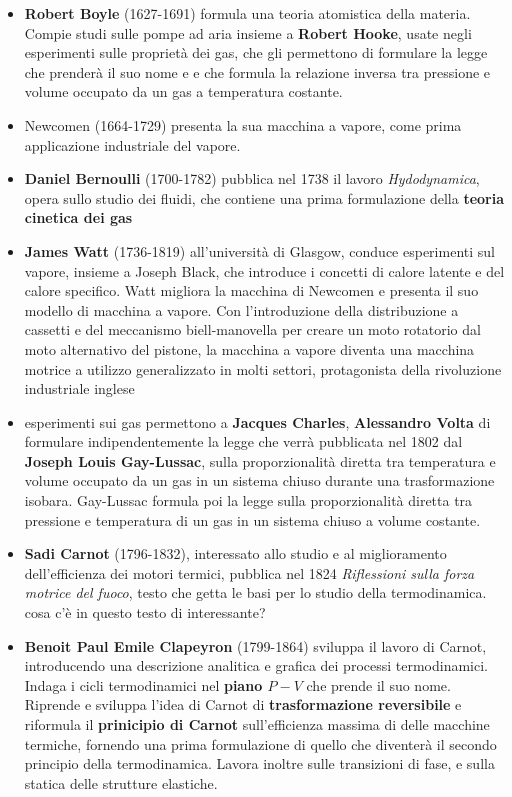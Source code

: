 
\begin{itemize}
    \item \textbf{Robert Boyle} (1627-1691) formula una teoria atomistica della materia. Compie studi sulle pompe ad aria insieme a \textbf{Robert Hooke}, usate negli esperimenti sulle proprietà dei gas, che gli permettono di formulare la legge che prenderà il suo nome e e che formula la relazione inversa tra pressione e volume occupato da un gas a temperatura costante.
    \item Newcomen (1664-1729) presenta la sua macchina a vapore, come prima applicazione industriale del vapore.
    \item \textbf{Daniel Bernoulli} (1700-1782) pubblica nel 1738 il lavoro \textit{Hydodynamica}, opera sullo studio dei fluidi, che contiene una prima formulazione della \textbf{teoria cinetica dei gas}
    \item \textbf{James Watt} (1736-1819) all'università di Glasgow, conduce esperimenti sul vapore, insieme a Joseph Black, che introduce i concetti di calore latente e del calore specifico. Watt migliora la macchina di Newcomen e presenta il suo modello di macchina a vapore. Con l'introduzione della distribuzione a cassetti e del meccanismo biell-manovella per creare un moto rotatorio dal moto alternativo del pistone, la macchina a vapore diventa una macchina motrice a utilizzo generalizzato in molti settori, protagonista della rivoluzione industriale inglese
    \item esperimenti sui gas permettono a \textbf{Jacques Charles}, \textbf{Alessandro Volta} di formulare indipendentemente la legge che verrà pubblicata nel 1802 dal \textbf{Joseph Louis Gay-Lussac}, sulla proporzionalità diretta tra temperatura e volume occupato da un gas in un sistema chiuso durante una trasformazione isobara. Gay-Lussac formula poi la legge sulla proporzionalità diretta tra pressione e temperatura di un gas in un sistema chiuso a volume costante.
    \item \textbf{Sadi Carnot} (1796-1832), interessato allo studio e al miglioramento dell'efficienza dei motori termici, pubblica nel 1824 \textit{Riflessioni sulla forza motrice del fuoco}, testo che getta le basi per lo studio della termodinamica. {\color{red} cosa c'è in questo testo di interessante?}
    \item \textbf{Benoit Paul Emile Clapeyron} (1799-1864) sviluppa il lavoro di Carnot, introducendo una descrizione analitica e grafica dei processi termodinamici. Indaga i cicli termodinamici nel \textbf{piano $P-V$} che prende il suo nome. Riprende e sviluppa l'idea di Carnot di \textbf{trasformazione reversibile} e riformula il \textbf{prinicipio di Carnot} sull'efficienza massima di delle macchine termiche, fornendo una prima formulazione di quello che diventerà il secondo principio della termodinamica. Lavora inoltre sulle transizioni di fase, e sulla statica delle strutture elastiche.

\end{itemize}
